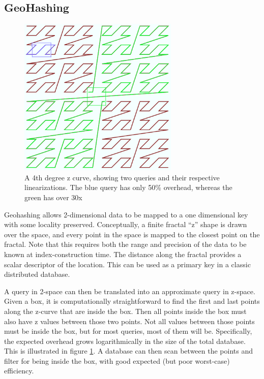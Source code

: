 \documentclass[11pt]{article}
\begin{document}
\subsection{GeoHashing}

\begin{figure}[b!]
\centering
\includegraphics[width=3in]{geohash}
\caption{A 4th degree z curve, showing two queries and their respective linearizations.  The blue query has only 50\% overhead, whereas the green has over 30x}
\label{fig:z}
\end{figure}

Geohashing allows 2-dimensional data to be mapped to a one dimensional key with some locality preserved.  Conceptually, a finite fractal ``z'' shape is drawn over the space, and every point in the space is mapped to the closest point on the fractal.  Note that this requires both the range and precision of the data to be known at index-construction time.  The distance along the fractal provides a scalar descriptor of the location.  This can be used as a primary key in a classic distributed database.\cite{gh}

A query in 2-space can then be translated into an approximate query in z-space.  Given a box, it is computationally straightforward to find the first and last points along the z-curve that are inside the box.  Then all points inside the box must also have z values between those two points.  Not all values between those points must be inside the box, but for most queries, most of them will be.  Specifically, the expected overhead grows logarithmically in the size of the total database\cite{ghs}.  This is illustrated in figure \ref{fig:z}. A database can then scan between the points and filter for being inside the box, with good expected (but poor worst-case) efficiency.
\end{document}
